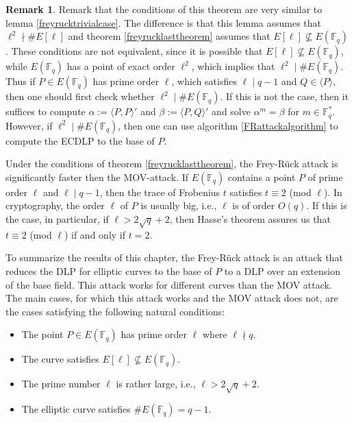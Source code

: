 \documentclass{article}
\numberwithin{equation}{section}
\theoremstyle{definition}
\newtheorem{remark}[theorem]{Remark}
\newcommand{\FF}[1]{{\mathbb F}_{#1}} %
\newcommand{\grgen}[1]{\langle #1 \rangle} %
\begin{document}
\begin{remark}
Remark that the conditions of this theorem are very similar to lemma \ref{freyrucktrivialcase}. The difference is that this lemma assumes that $\ell^2 \nmid \#E[\ell]$ and theorem \ref{freyrucklasttheorem} assumes that $E[\ell] \not \subseteq E(\FF{q})$. These conditions are not equivalent, since it is possible that $E[\ell] \not \subseteq E(\FF{q})$, while $E(\FF{q})$ has a point of exact order $\ell^2$, which implies that $\ell^2 \mid \#E(\FF{q})$. Thus if $P\in E(\FF{q})$ has prime order $\ell$, which satisfies $\ell \mid q-1$ and $Q\in\grgen{P}$, then one should first check whether $\ell^2 \mid \#E(\FF{q})$. If this is not the case, then it suffices to compute $\alpha:=\langle P,P\rangle'$ and $\beta:=\langle P,Q \rangle'$ and solve $\alpha^m=\beta$ for $m \in \FF{q}^*$. However, if $\ell^2 \mid \#E(\FF{q})$, then one can use algorithm \ref{FRattackalgorithm} to compute the ECDLP to the base of $P$. 
\end{remark}

Under the conditions of theorem \ref{freyrucklasttheorem}, the Frey-R\"uck attack is significantly faster then the MOV-attack. If $E(\FF{q})$ contains a point $P$ of prime order $\ell$ and $\ell\mid q-1$, then the trace of Frobenius $t$ satisfies $t\equiv 2$ (mod $\ell$). In cryptography, the order $\ell$ of $P$ is usually big, i.e., $\ell$ is of order $O(q)$. If this is the case, in particular, if $\ell >2\sqrt{q}+2$, then Hasse's theorem assures us that $t\equiv 2$ (mod $\ell$) if and only if $t=2$.\par 
To summarize the results of this chapter, the Frey-R\"uck attack is an attack that reduces the DLP for elliptic curves to the base of $P$ to a DLP over an extension of the base field. This attack works for different curves than the MOV attack. The main cases, for which this attack works and the MOV attack does not, are the cases satisfying the following natural conditions:
\begin{itemize}
\item The point $P \in E(\FF{q})$ has prime order $\ell$ where $\ell \nmid q$.
\item The curve satisfies $E[\ell] \not \subseteq E(\FF{q})$.
\item The prime number $\ell$ is rather large, i.e., $\ell > 2\sqrt{q}+2$.
\item The elliptic curve satisfies $\#E(\FF{q})=q-1$. 
\end{itemize}\newpage
\end{document}
